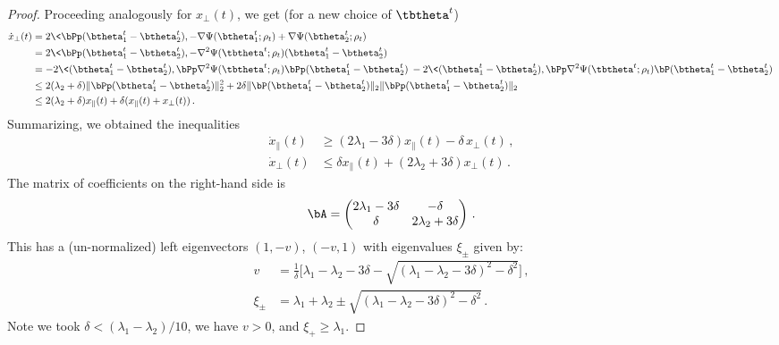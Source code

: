 \documentclass[11pt]{article}
\begin{document}
\begin{proof}
Proceeding analogously for $x_{\perp}(t)$, we get (for a new choice of $\tbtheta^t$)
%
\begin{align*}
%
\dot{x}_{\perp}(t)& = 2\<\bPp(\btheta_1^t-\btheta_2^t), -\nabla\Psi(\btheta_1^t;\rho_t) +\nabla\Psi(\btheta_2^t;\rho_t)\>\\
& = 2\<\bPp(\btheta_1^t-\btheta_2^t), -\nabla^2\Psi(\tbtheta^t;\rho_t)(\btheta_1^t-\btheta^t_2)\>\\
& = - 2\<(\btheta_1^t-\btheta_2^t), \bPp \nabla^2\Psi(\tbtheta^t;\rho_t) \bPp(\btheta_1^t-\btheta^t_2)\> -
2\<(\btheta_1^t-\btheta_2^t), \bPp \nabla^2\Psi(\tbtheta^t;\rho_t) \bP(\btheta_1^t-\btheta^t_2)\>\\
& \le 2(\lambda_2+\delta) \| \bPp(\btheta_1^t-\btheta^t_2)\|_2^2+2\delta \|\bP(\btheta_1^t-\btheta^t_2)\|_2 \|\bPp(\btheta_1^t-\btheta^t_2)\|_2\\
&\le 2(\lambda_2+\delta) x_{\parallel}(t) +\delta(x_{\parallel}(t)+x_{\perp}(t))\, .
%
\end{align*}
%
Summarizing, we obtained the inequalities 
%
\begin{align}
%
\dot{x}_{\parallel}(t)& \ge (2\lambda_1-3\delta) x_{\parallel}(t) -\delta\, x_{\perp}(t)\, ,\label{eq:x_xp_1}\\
\dot{x}_{\perp}(t)& \le \delta x_{\parallel}(t) + (2\lambda_2+3\delta) x_{\perp}(t) \, . \label{eq:x_xp_2}
%
\end{align}
%
The matrix of coefficients on the right-hand side is
%
\begin{align}
%
\bA = \left(
\begin{matrix}
2\lambda_1-3\delta & -\delta\\
\delta & 2\lambda_2+3\delta
\end{matrix}\right)\, .
%
\end{align}
%
This has a (un-normalized)  left eigenvectors $(1, -v)$, $(-v,1)$ with eigenvalues $\xi_{\pm}$
given by:
%
\begin{align}
%
v & =\frac{1}{\delta}\Big[\lambda_1-\lambda_2-3\delta-\sqrt{(\lambda_1-\lambda_2-3\delta)^2-\delta^2}\Big] \, ,\\
\xi_{\pm} & = \lambda_1+\lambda_2\pm \sqrt{(\lambda_1-\lambda_2-3\delta)^2-\delta^2}\, .
%
\end{align}
%
Note we took $\delta < (\lambda_1 - \lambda_2) / 10$, we have $v > 0$,
and $\xi_+ \ge \lambda_1$. 


\end{proof}
\end{document}
